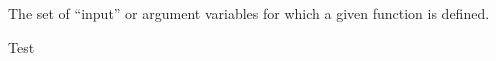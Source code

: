 {%
  The set of ``input'' or argument variables for which a given function is defined.
}

{%
  Test
}

